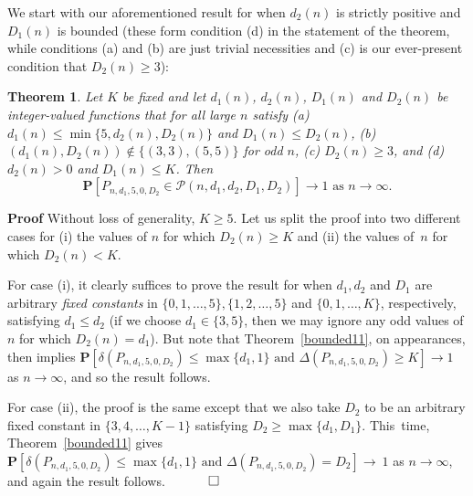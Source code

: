 \documentclass{article}
\newtheorem{Theorem}{Theorem}
\newtheorem{Proof of Theorem}{Proof of Theorem}
\begin{document}
We start with our aforementioned result for when $d_{2}(n)$ is strictly positive and $D_{1}(n)$ is bounded
(these form condition (d) in the statement of the theorem,
while conditions (a) and (b) are just trivial necessities 
and (c) is our ever-present condition that $D_{2}(n) \geq 3$):















\begin{Theorem} \label{bounded791}
Let $K$ be fixed
and let $d_{1}(n)$, $d_{2}(n)$, $D_{1}(n)$ and $D_{2}(n)$ be integer-valued functions 
that for all large $n$ satisfy
(a) $d_{1}(n) \leq \min \{ 5,d_{2}(n),D_{2}(n) \}$ and $D_{1}(n) \leq D_{2}(n)$,
(b) $(d_{1}(n), D_{2}(n)) \notin \{ (3,3),(5,5) \}$ for odd $n$,
(c) $D_{2}(n) \geq 3$,
and (d) $d_{2}(n) > 0$ and $D_{1}(n) \leq K$.
Then
\begin{displaymath}
\mathbf{P}[P_{n,d_{1},5,0,D_{2}} \in \mathcal{P}(n,d_{1},d_{2},D_{1},D_{2})] \to 1 \textrm{ as } n \to \infty.
\end{displaymath} 
\end{Theorem} 
\textbf{Proof}
Without loss of generality, $K \geq 5$.
Let us split the proof into two different cases for
(i) the values of $n$ for which $D_{2}(n) \geq K$
and (ii) the values of~$n$ for which $D_{2}(n) < K$.

For case (i),
it clearly suffices to prove the result for when $d_{1},d_{2}$ and $D_{1}$
are arbitrary \textit{fixed constants} in
$\{ 0,1, \ldots, 5 \}, \{ 1,2, \ldots, 5 \}$ and $\{ 0,1, \ldots, K \}$,
respectively, satisfying $d_{1} \leq d_{2}$
(if we choose $d_{1} \in \{ 3,5 \}$,
then we may ignore any odd values of $n$ for which $D_{2}(n) = d_{1}$).
But note that Theorem~\ref{bounded11},
on appearances,
then implies
$\mathbf{P}
[\delta(P_{n,d_{1},5,0,D_{2}}) \leq \max \{ d_{1},1 \} \textrm{ and } \Delta(P_{n,d_{1},5,0,D_{2}}) \geq K] \to 1$
as $n \to \infty$,
and so the result follows.

For case (ii),
the proof is the same except that we also take $D_{2}$ to be an arbitrary fixed constant in $\{ 3,4, \ldots, K-1 \}$
satisfying $D_{2} \geq \max \{ d_{1}, D_{1} \}$.
This~time,
Theorem~\ref{bounded11} gives
$\mathbf{P}
[\delta(P_{n,d_{1},5,0,D_{2}}) \leq \max \{ d_{1},1 \} \textrm{ and } \Delta(P_{n,d_{1},5,0,D_{2}}) = D_{2}] \to~\!1$
as $n \to \infty$,
and again the result follows.
$\phantom{qwerty} 
\setlength{\unitlength}{.25cm}
\begin{picture}(1,1)
\put(0,0){\line(1,0){1}}
\put(0,0){\line(0,1){1}}
\put(1,1){\line(-1,0){1}}
\put(1,1){\line(0,-1){1}}
\end{picture}$ \\
\\
\end{document}
